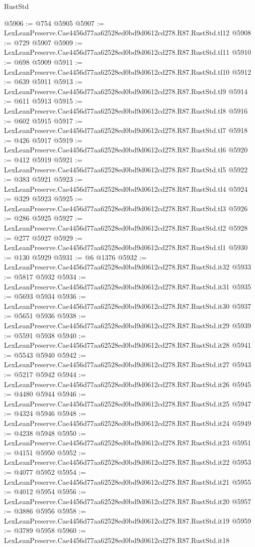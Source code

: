 \begin{lexlean}{RustStd}
\begin{coremodule}
{{@5906 := @754 @5905
@5907 := LexLeanPreserve.Cae4456d77aa62528ed0bd9d0612cd278.R87.RustStd.tl12
@5908 := @729 @5907
@5909 := LexLeanPreserve.Cae4456d77aa62528ed0bd9d0612cd278.R87.RustStd.tl11
@5910 := @698 @5909
@5911 := LexLeanPreserve.Cae4456d77aa62528ed0bd9d0612cd278.R87.RustStd.tl10
@5912 := @639 @5911
@5913 := LexLeanPreserve.Cae4456d77aa62528ed0bd9d0612cd278.R87.RustStd.tl9
@5914 := @611 @5913
@5915 := LexLeanPreserve.Cae4456d77aa62528ed0bd9d0612cd278.R87.RustStd.tl8
@5916 := @602 @5915
@5917 := LexLeanPreserve.Cae4456d77aa62528ed0bd9d0612cd278.R87.RustStd.tl7
@5918 := @426 @5917
@5919 := LexLeanPreserve.Cae4456d77aa62528ed0bd9d0612cd278.R87.RustStd.tl6
@5920 := @412 @5919
@5921 := LexLeanPreserve.Cae4456d77aa62528ed0bd9d0612cd278.R87.RustStd.tl5
@5922 := @383 @5921
@5923 := LexLeanPreserve.Cae4456d77aa62528ed0bd9d0612cd278.R87.RustStd.tl4
@5924 := @329 @5923
@5925 := LexLeanPreserve.Cae4456d77aa62528ed0bd9d0612cd278.R87.RustStd.tl3
@5926 := @286 @5925
@5927 := LexLeanPreserve.Cae4456d77aa62528ed0bd9d0612cd278.R87.RustStd.tl2
@5928 := @277 @5927
@5929 := LexLeanPreserve.Cae4456d77aa62528ed0bd9d0612cd278.R87.RustStd.tl1
@5930 := @130 @5929
@5931 := @6 @1376
@5932 := LexLeanPreserve.Cae4456d77aa62528ed0bd9d0612cd278.R87.RustStd.it32
@5933 := @5817 @5932
@5934 := LexLeanPreserve.Cae4456d77aa62528ed0bd9d0612cd278.R87.RustStd.it31
@5935 := @5693 @5934
@5936 := LexLeanPreserve.Cae4456d77aa62528ed0bd9d0612cd278.R87.RustStd.it30
@5937 := @5651 @5936
@5938 := LexLeanPreserve.Cae4456d77aa62528ed0bd9d0612cd278.R87.RustStd.it29
@5939 := @5591 @5938
@5940 := LexLeanPreserve.Cae4456d77aa62528ed0bd9d0612cd278.R87.RustStd.it28
@5941 := @5543 @5940
@5942 := LexLeanPreserve.Cae4456d77aa62528ed0bd9d0612cd278.R87.RustStd.it27
@5943 := @5217 @5942
@5944 := LexLeanPreserve.Cae4456d77aa62528ed0bd9d0612cd278.R87.RustStd.it26
@5945 := @4480 @5944
@5946 := LexLeanPreserve.Cae4456d77aa62528ed0bd9d0612cd278.R87.RustStd.it25
@5947 := @4324 @5946
@5948 := LexLeanPreserve.Cae4456d77aa62528ed0bd9d0612cd278.R87.RustStd.it24
@5949 := @4238 @5948
@5950 := LexLeanPreserve.Cae4456d77aa62528ed0bd9d0612cd278.R87.RustStd.it23
@5951 := @4151 @5950
@5952 := LexLeanPreserve.Cae4456d77aa62528ed0bd9d0612cd278.R87.RustStd.it22
@5953 := @4077 @5952
@5954 := LexLeanPreserve.Cae4456d77aa62528ed0bd9d0612cd278.R87.RustStd.it21
@5955 := @4012 @5954
@5956 := LexLeanPreserve.Cae4456d77aa62528ed0bd9d0612cd278.R87.RustStd.it20
@5957 := @3886 @5956
@5958 := LexLeanPreserve.Cae4456d77aa62528ed0bd9d0612cd278.R87.RustStd.it19
@5959 := @3789 @5958
@5960 := LexLeanPreserve.Cae4456d77aa62528ed0bd9d0612cd278.R87.RustStd.it18
}}
\end{coremodule}
\end{lexlean}
